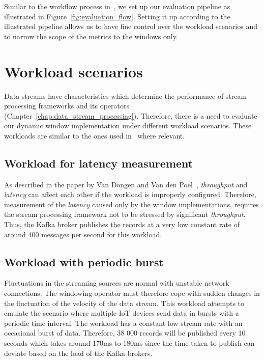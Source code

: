 Similar to the workflow process in~\cite{evalution_of_spe, benchmark_sce}, we set up
our evaluation pipeline as illustrated in Figure~\ref{fig:evaluation_flow}. Setting it 
up according to the illustrated pipeline allows us to have fine control over the 
workload scenarios and to narrow the scope of the metrics to the windows only. 




\section{Workload scenarios}
\label{sec:workload}
Data streams have characteristics 
which determine the performance of stream processing frameworks and its 
operators (Chapter~\ref{chap:data_stream_processing}). Therefore, 
there is a need to evaluate our dynamic window implementation under different workload scenarios. 
These workloads are similar to the ones used in~\cite{evalution_of_spe} where relevant.

\subsection{Workload for latency measurement}
As described in the paper by Van Dongen and Van den Poel~\cite{evalution_of_spe}, 
\emph{throughput} and \emph{latency} can affect each other if the workload is 
improperly configured. Therefore, measurement of the \emph{latency} caused only 
by the window implementations, requires the stream processing framework not to be 
stressed by significant \emph{throughput}. Thus, the Kafka broker 
publishes the records at a very low constant rate of around 400 messages per second for 
this workload. 


\subsection{Workload with periodic burst}
Fluctuations in the streaming sources are normal with unstable network connections. 
The windowing operator must therefore cope with sudden changes in the 
fluctuation of the velocity of the data stream. This workload attempts to emulate 
the scenario where multiple IoT devices send data in bursts with a periodic 
time interval. The workload has a constant low stream rate with an occasional 
burst of data. Therefore, 38 000 records will be published every 10 seconds which 
takes around 170ms to 180ms since the time taken to publish can deviate based on the 
load of the Kafka brokers. 


